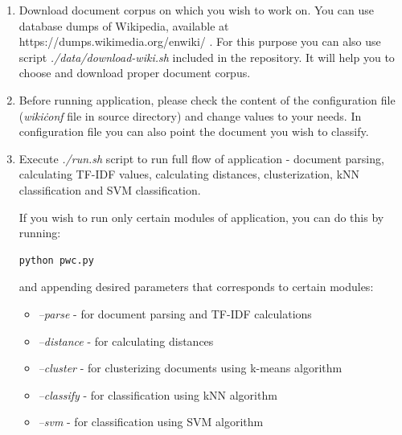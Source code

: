 \begin{enumerate}
	\item Download document corpus on which you wish to work on. You can use database dumps of Wikipedia, available at https://dumps.wikimedia.org/enwiki/ . For this purpose you can also use script \textit{./data/download-wiki.sh} included in the repository. It will help you to choose and download proper document corpus.
	
	\item Before running application, please check the content of the configuration file (\textit{wiki\.conf} file in source directory) and change values to your needs. In configuration file you can also point the document you wish to classify.
	
	\item Execute \textit{./run.sh} script to run full flow of application - document parsing, calculating TF-IDF values, calculating distances, clusterization, kNN classification and SVM classification. 
	
	If you wish to run only certain modules of application, you can do this by running:
	\begin{lstlisting}[language=Bash, numbers=none]
	python pwc.py
	\end{lstlisting}
	and appending desired parameters that corresponds to certain modules:
	\begin{itemize}
		\item \textit{--parse} - for document parsing and TF-IDF calculations
		\item \textit{--distance} - for calculating distances
		\item \textit{--cluster} - for clusterizing documents using k-means algorithm
		\item \textit{--classify} - for classification using kNN algorithm
		\item \textit{--svm} - for classification using SVM algorithm
	\end{itemize}
\end{enumerate}